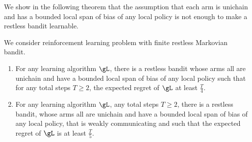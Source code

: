 We show in the following theorem that the assumption that each arm is unichain and has a bounded local span of bias of any local policy is not enough to make a restless bandit learnable.

\begin{thm}
    \label{thm:non_learnable}
    We consider reinforcement learning problem with finite restless Markovian bandit.
    \begin{enumerate}[label=(\roman*)]
        \item \label{it:non_learnable1} For any learning algorithm $\gL$, there is a restless bandit whose arms all are unichain and have a bounded local span of bias of any local policy such that for any total steps $T\ge2$, the expected regret of $\gL$ at least $\frac{T}4$.
        \item \label{it:non_learnable2} For any learning algorithm $\gL$, any total steps $T\ge2$, there is a restless bandit, whose arms all are unichain and have a bounded local span of bias of any local policy, that is weakly communicating and such that the expected regret of $\gL$ is at least $\frac{T}5$.
    \end{enumerate}
\end{thm}
